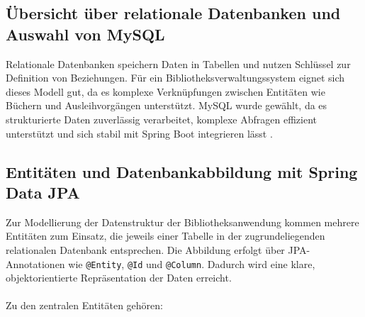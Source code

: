 \subsection{Übersicht über relationale Datenbanken und Auswahl von MySQL}
Relationale Datenbanken speichern Daten in Tabellen und nutzen Schlüssel zur Definition von Beziehungen. Für ein Bibliotheksverwaltungssystem eignet sich dieses Modell gut, da es komplexe Verknüpfungen zwischen Entitäten wie Büchern und Ausleihvorgängen unterstützt. MySQL wurde gewählt, da es strukturierte Daten zuverlässig verarbeitet, komplexe Abfragen effizient unterstützt und sich stabil mit Spring Boot integrieren lässt \cite{IBM:o.J}.

\subsection{Entitäten und Datenbankabbildung mit Spring Data JPA}
\label{sec:entity_mapping}

Zur Modellierung der Datenstruktur der Bibliotheksanwendung kommen mehrere Entitäten zum Einsatz, die jeweils einer Tabelle in der zugrundeliegenden relationalen Datenbank entsprechen. Die Abbildung erfolgt über JPA-Annotationen wie \texttt{@Entity}, \texttt{@Id} und \texttt{@Column}. Dadurch wird eine klare, objektorientierte Repräsentation der Daten erreicht. \\ \\
Zu den zentralen Entitäten gehören:

